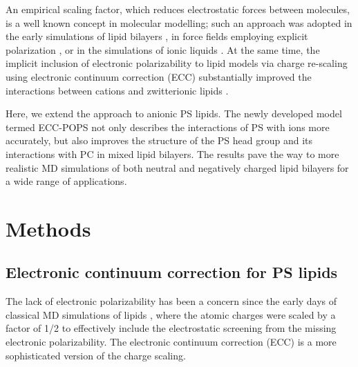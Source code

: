 \documentclass[journal=jpcbfk,manuscript=article]{achemso}
\begin{document}
An empirical scaling factor, which reduces electrostatic forces between molecules, 
is a well known concept in molecular modelling;
such an approach was adopted in the early simulations of lipid bilayers \cite{egberts94, berendsen1996},
in force fields employing explicit polarization \cite{lemkul2016empirical},
or in the simulations of ionic liquids \cite{Bhargava2007}. 
At the same time, 
the implicit inclusion of electronic polarizability to lipid models
via charge re-scaling using electronic continuum correction (ECC) 
substantially improved the interactions between cations and zwitterionic lipids \cite{melcr18}. 


Here, we extend the approach to anionic PS lipids.
The newly developed model termed ECC-POPS 
not only describes the interactions of PS with ions more accurately, 
but also improves the structure of the PS head group 
and its interactions with PC in mixed lipid bilayers. 
The results pave the way to more realistic MD simulations 
of both neutral and negatively charged lipid bilayers 
for a wide range of applications.


 
\section{Methods} 
 
\subsection{Electronic continuum correction for PS lipids}\label{section:ecc} 

The lack of electronic polarizability has been a concern since the
early days of classical MD simulations of lipids \cite{jonsson86,egberts94, berendsen1996},
where the atomic charges were scaled by a factor of 1/2 to effectively
include the electrostatic screening from the missing electronic polarizability.
The electronic continuum correction (ECC) is a more sophisticated version of the charge scaling.
\end{document}
